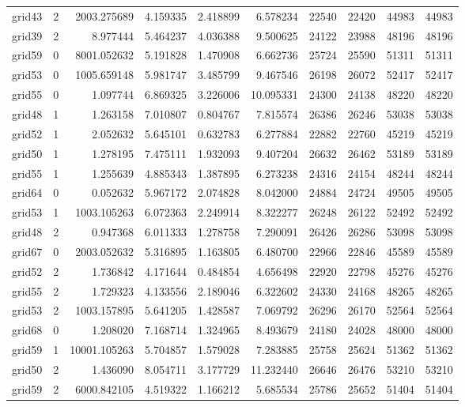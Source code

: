 \begin{longtable}{|l|r|r|r|r|r|r|r|r|r|}
grid43 & 2 & 2003.275689 & 4.159335 & 2.418899 & 6.578234 & 22540 & 22420 & 44983 & 44983 \\
grid39 & 2 & 8.977444 & 5.464237 & 4.036388 & 9.500625 & 24122 & 23988 & 48196 & 48196 \\
grid59 & 0 & 8001.052632 & 5.191828 & 1.470908 & 6.662736 & 25724 & 25590 & 51311 & 51311 \\
grid53 & 0 & 1005.659148 & 5.981747 & 3.485799 & 9.467546 & 26198 & 26072 & 52417 & 52417 \\
grid55 & 0 & 1.097744 & 6.869325 & 3.226006 & 10.095331 & 24300 & 24138 & 48220 & 48220 \\
grid48 & 1 & 1.263158 & 7.010807 & 0.804767 & 7.815574 & 26386 & 26246 & 53038 & 53038 \\
grid52 & 1 & 2.052632 & 5.645101 & 0.632783 & 6.277884 & 22882 & 22760 & 45219 & 45219 \\
grid50 & 1 & 1.278195 & 7.475111 & 1.932093 & 9.407204 & 26632 & 26462 & 53189 & 53189 \\
grid55 & 1 & 1.255639 & 4.885343 & 1.387895 & 6.273238 & 24316 & 24154 & 48244 & 48244 \\
grid64 & 0 & 0.052632 & 5.967172 & 2.074828 & 8.042000 & 24884 & 24724 & 49505 & 49505 \\
grid53 & 1 & 1003.105263 & 6.072363 & 2.249914 & 8.322277 & 26248 & 26122 & 52492 & 52492 \\
grid48 & 2 & 0.947368 & 6.011333 & 1.278758 & 7.290091 & 26426 & 26286 & 53098 & 53098 \\
grid67 & 0 & 2003.052632 & 5.316895 & 1.163805 & 6.480700 & 22966 & 22846 & 45589 & 45589 \\
grid52 & 2 & 1.736842 & 4.171644 & 0.484854 & 4.656498 & 22920 & 22798 & 45276 & 45276 \\
grid55 & 2 & 1.729323 & 4.133556 & 2.189046 & 6.322602 & 24330 & 24168 & 48265 & 48265 \\
grid53 & 2 & 1003.157895 & 5.641205 & 1.428587 & 7.069792 & 26296 & 26170 & 52564 & 52564 \\
grid68 & 0 & 1.208020 & 7.168714 & 1.324965 & 8.493679 & 24180 & 24028 & 48000 & 48000 \\
grid59 & 1 & 10001.105263 & 5.704857 & 1.579028 & 7.283885 & 25758 & 25624 & 51362 & 51362 \\
grid50 & 2 & 1.436090 & 8.054711 & 3.177729 & 11.232440 & 26646 & 26476 & 53210 & 53210 \\
grid59 & 2 & 6000.842105 & 4.519322 & 1.166212 & 5.685534 & 25786 & 25652 & 51404 & 51404 \\

\end{longtable}
